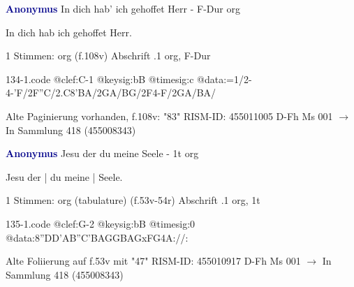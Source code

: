 \documentclass[twocolumn]{book}
\begin{document}
\newline \par \vspace{7pt} \textcolor{darkblue}{\textbf{Anonymus  }}
\newline In dich hab' ich gehoffet Herr - F-Dur
\newline org
\newline \begin{itshape}[f.108v, heading:] In dich hab ich gehoffet Herr.\end{itshape} 
\newline \textcolor{darkblue}{}  1 Stimmen: org  (f.108v)
\newline Abschrift
.1  org, F-Dur  
\begin{filecontents*}{134-1.code}
@clef:C-1
@keysig:bB
@timesig:c
@data:=1/2-4-'F/2F''C/2.C{8'BA}/2GA/BG/2F4-F/2GA/BA/
\end{filecontents*}
\newline
%
\newline Alte Paginierung vorhanden, f.108v: "83"
\newline RISM-ID: 455011005
\newline D-Fh  Ms 001
\newline $\rightarrow$ In Sammlung 418 (455008343)
      
\newline \par \vspace{7pt} \textcolor{darkblue}{\textbf{Anonymus  }}
\newline Jesu der du meine Seele - 1t
\newline org
\newline \begin{itshape}[f.53v, at left:] Jesu der | du meine | Seele.\end{itshape} 
\newline \textcolor{darkblue}{}  1 Stimmen: org (tabulature)  (f.53v-54r)
\newline Abschrift
.1  org, 1t  
\begin{filecontents*}{135-1.code}
@clef:G-2
@keysig:bB
@timesig:0
@data:{8''DD'AB}{''C'BAG}{GBAG}{xFG}4A://:
\end{filecontents*}
\newline
%
\newline Alte Foliierung auf f.53v mit "47"
\newline RISM-ID: 455010917
\newline D-Fh  Ms 001
\newline $\rightarrow$ In Sammlung 418 (455008343)
      
\end{document}
